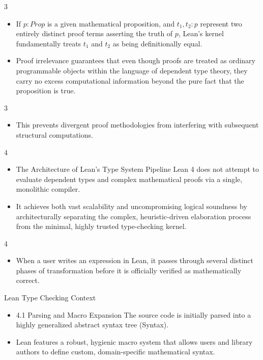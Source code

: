 \documentclass[10pt]{beamer}
\begin{document}
\begin{frame}{3}
\begin{itemize}\setlength{\itemsep}{1.5em}
  \item If $p : Prop$ is a given mathematical proposition, and $t_1, t_2 : p$ represent two entirely distinct proof terms asserting the truth of $p$, Lean's kernel fundamentally treats $t_1$ and $t_2$ as being definitionally equal.
  \item Proof irrelevance guarantees that even though proofs are treated as ordinary programmable objects within the language of dependent type theory, they carry no excess computational information beyond the pure fact that the proposition is true.
\end{itemize}
\end{frame}

\begin{frame}{3}
\begin{itemize}\setlength{\itemsep}{1.5em}
  \item This prevents divergent proof methodologies from interfering with subsequent structural computations.
\end{itemize}
\end{frame}

\begin{frame}{4}
\begin{itemize}\setlength{\itemsep}{1.5em}
  \item The Architecture of Lean's Type System Pipeline Lean 4 does not attempt to evaluate dependent types and complex mathematical proofs via a single, monolithic compiler.
  \item It achieves both vast scalability and uncompromising logical soundness by architecturally separating the complex, heuristic-driven elaboration process from the minimal, highly trusted type-checking kernel.
\end{itemize}
\end{frame}

\begin{frame}{4}
\begin{itemize}\setlength{\itemsep}{1.5em}
  \item When a user writes an expression in Lean, it passes through several distinct phases of transformation before it is officially verified as mathematically correct.
\end{itemize}
\end{frame}

\begin{frame}{Lean Type Checking Context}
\begin{itemize}\setlength{\itemsep}{1.5em}
  \item 4.1 Parsing and Macro Expansion The source code is initially parsed into a highly generalized abstract syntax tree (Syntax).
  \item Lean features a robust, hygienic macro system that allows users and library authors to define custom, domain-specific mathematical syntax.
\end{itemize}
\end{frame}
\end{document}
